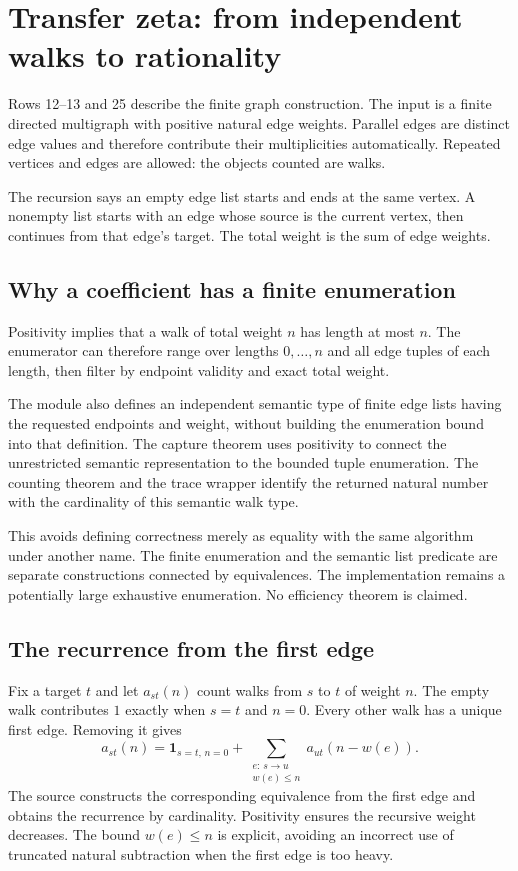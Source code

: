 \section{Transfer zeta: from independent walks to rationality}\label{sec:zeta}

Rows 12--13 and 25 describe the finite graph construction. The input is a finite directed multigraph with positive natural edge weights. Parallel edges are distinct edge values and therefore contribute their multiplicities automatically. Repeated vertices and edges are allowed: the objects counted are walks.

The recursion  says an empty edge list starts and ends at the same vertex. A nonempty list starts with an edge whose source is the current vertex, then continues from that edge's target. The total weight is the sum of edge weights.

\subsection{Why a coefficient has a finite enumeration}

Positivity implies that a walk of total weight $n$ has length at most $n$. The enumerator can therefore range over lengths $0,\ldots,n$ and all edge tuples of each length, then filter by endpoint validity and exact total weight.

The module also defines an independent semantic type of finite edge lists having the requested endpoints and weight, without building the enumeration bound into that definition. The capture theorem uses positivity to connect the unrestricted semantic representation to the bounded tuple enumeration. The counting theorem and the trace wrapper identify the returned natural number with the cardinality of this semantic walk type.

This avoids defining correctness merely as equality with the same algorithm under another name. The finite enumeration and the semantic list predicate are separate constructions connected by equivalences. The implementation remains a potentially large exhaustive enumeration. No efficiency theorem is claimed.

\subsection{The recurrence from the first edge}

Fix a target $t$ and let $a_{st}(n)$ count walks from $s$ to $t$ of weight $n$. The empty walk contributes $1$ exactly when $s=t$ and $n=0$. Every other walk has a unique first edge. Removing it gives
\[
a_{st}(n)=\mathbf 1_{s=t,\,n=0}
+\sum_{\substack{e:\,s\to u\\w(e)\le n}}a_{ut}(n-w(e)).
\]
The source constructs the corresponding equivalence from the first edge and obtains the recurrence by cardinality. Positivity ensures the recursive weight decreases. The bound $w(e)\le n$ is explicit, avoiding an incorrect use of truncated natural subtraction when the first edge is too heavy.

